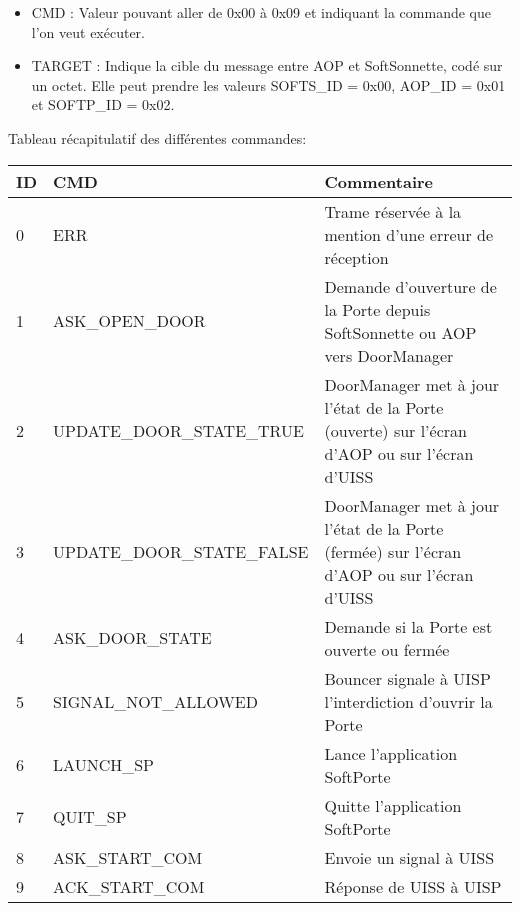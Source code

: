     \begin{itemize}
        \item {CMD : Valeur pouvant aller de 0x00 à 0x09 et indiquant la commande que l'on veut exécuter.}
        \item {TARGET : Indique la cible du message entre AOP et SoftSonnette, codé sur un octet. 
        Elle peut prendre les valeurs SOFTS\_ID = 0x00, AOP\_ID = 0x01 et SOFTP\_ID = 0x02.}
       
    \end{itemize} 

    Tableau récapitulatif des différentes commandes: 

    \begin {table}[H]
    \center
    \begin{tabularx}{\textwidth}{|p{0.5cm}|X|X|}
        \hline
        \textbf{ID} & \textbf{CMD} & \textbf{Commentaire} \\
        \hline
        0 & ERR & Trame réservée à la mention d'une erreur de réception \\
        \hline
        1 & ASK\_OPEN\_DOOR & Demande d'ouverture de la Porte depuis SoftSonnette ou AOP vers DoorManager\\
        \hline
        2 & UPDATE\_DOOR\_STATE\_TRUE & DoorManager met à jour l'état de la Porte (ouverte) sur l'écran d'AOP ou sur l'écran d'UISS\\
        \hline
        3 & UPDATE\_DOOR\_STATE\_FALSE & DoorManager met à jour l'état de la Porte (fermée) sur l'écran d'AOP ou sur l'écran d'UISS\\
        \hline
        4 & ASK\_DOOR\_STATE & Demande si la Porte est ouverte ou fermée \\
        \hline
        5 & SIGNAL\_NOT\_ALLOWED & Bouncer signale à UISP l'interdiction d'ouvrir la Porte \\
        \hline
        6 & LAUNCH\_SP & Lance l'application SoftPorte \\
        \hline
        7 & QUIT\_SP & Quitte l'application SoftPorte \\
        \hline
        8 & ASK\_START\_COM & Envoie un signal à UISS \\
        \hline
        9 & ACK\_START\_COM & Réponse de UISS à UISP \\
        \hline
    \end{tabularx}
    \end{table}

